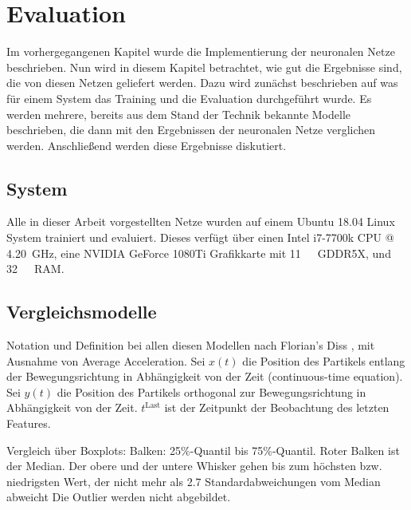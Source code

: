 \chapter{Evaluation}
\label{cap:Eval}

Im vorhergegangenen Kapitel wurde die Implementierung der neuronalen Netze beschrieben.
Nun wird in diesem Kapitel betrachtet, wie gut die Ergebnisse sind, die von diesen Netzen geliefert werden.
Dazu wird zunächst beschrieben auf was für einem System das Training und die Evaluation durchgeführt wurde.
Es werden mehrere, bereits aus dem Stand der Technik bekannte Modelle beschrieben, die dann mit den Ergebnissen der neuronalen Netze 
verglichen werden.
Anschließend werden diese Ergebnisse diskutiert.

\section{System}

Alle in dieser Arbeit vorgestellten Netze wurden auf einem Ubuntu 18.04 Linux System trainiert und evaluiert.
Dieses verfügt über einen Intel i7-7700k CPU @ \SI{4.20}{\giga\hertz}, eine NVIDIA GeForce 1080Ti Grafikkarte mit \SI{11}{\giga\byte}~GDDR5X,
und \SI{32}{\giga\byte}~RAM. 


\section{Vergleichsmodelle}

\color{blue}
Notation und Definition bei allen diesen Modellen nach Florian's Diss \cite{Pfaff2018}, mit Ausnahme von Average Acceleration.
Sei \(x(t)\) die Position des Partikels entlang der Bewegungsrichtung in Abhängigkeit von der Zeit
(continuous-time equation).
Sei \( y(t)\) die Position des Partikels orthogonal zur Bewegungsrichtung in Abhängigkeit von der Zeit.
\(t^{\text{Last}}\) ist der Zeitpunkt der Beobachtung des letzten Features.

Vergleich über Boxplots: Balken: 25\%-Quantil bis 75\%-Quantil.
Roter Balken ist der Median. Der obere und der untere Whisker 
gehen bis zum höchsten bzw. niedrigsten Wert, der nicht mehr als 2.7 Standardabweichungen vom Median abweicht
Die Outlier werden nicht abgebildet.

